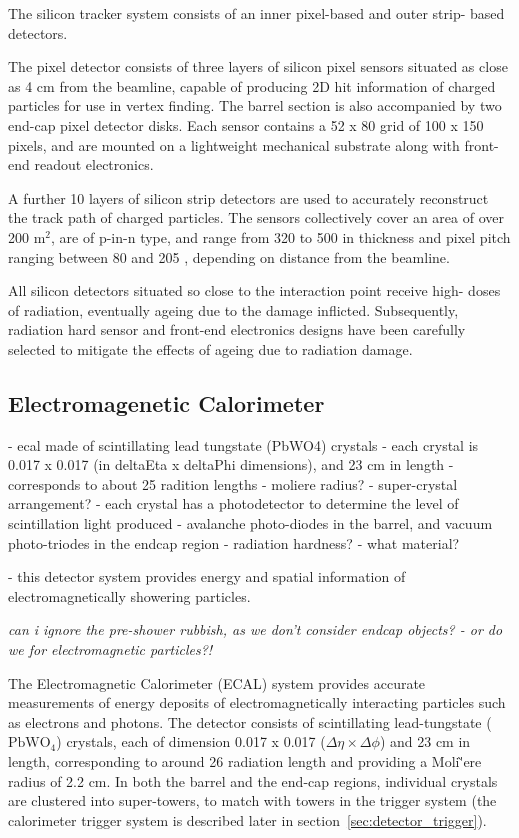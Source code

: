 The silicon tracker system consists of an inner pixel-based and outer strip-
based detectors.

The pixel detector consists of three layers of silicon pixel sensors situated 
as close as 4 cm from the beamline, capable 
of producing 2D hit information of charged particles for use in vertex 
finding. The barrel section is also accompanied by two end-cap pixel detector 
disks. Each sensor contains a 52 x 80 grid of 100 \microm x 150 \microm pixels, 
and are mounted on a lightweight mechanical substrate along with front-end readout 
electronics.

A further 10 layers of silicon strip detectors are used to accurately 
reconstruct the track path of charged particles. The sensors collectively cover 
an area of over 200 $\text{m}^2$, are of p-in-n type, and range from 320 \microm
to 500 \microm in thickness and pixel pitch ranging between 80 \microm and 
205 \microm, depending on distance from the beamline.

All silicon detectors situated so close to the interaction point receive high-
doses of radiation, eventually ageing due to the damage inflicted. Subsequently, 
radiation hard sensor and front-end electronics designs have been carefully 
selected to mitigate the effects of ageing due to radiation damage.

\subsection{Electromagenetic Calorimeter}

- ecal made of scintillating lead tungstate (PbWO4) crystals
    - each crystal is 0.017 x 0.017 (in deltaEta x deltaPhi dimensions), and 23 
    cm in length
        -   corresponds to about 25 radition lengths
        - moliere radius?
    - super-crystal arrangement?
- each crystal has a photodetector to determine the level of scintillation light
produced
    - avalanche photo-diodes in the barrel, and vacuum photo-triodes in the 
    endcap region
    - radiation hardness?
    - what material?

- this detector system provides energy and spatial information of
electromagnetically showering particles.

\emph{can i ignore the pre-shower rubbish, as we don't consider endcap objects? 
- or do we for electromagnetic particles?!}

The Electromagnetic Calorimeter (ECAL) system provides accurate measurements of 
energy deposits of electromagnetically interacting particles such as 
electrons and photons. The detector consists of scintillating lead-tungstate
($\text{PbWO}_4$) crystals, each of dimension 0.017 x 0.017 ($\Delta \eta \times
\Delta \phi$) and 23 cm in length, corresponding to around 26 radiation length 
and providing a Moli\`'{e}re radius of 2.2 cm. In both the barrel and the
end-cap regions, individual crystals are clustered
into super-towers, to match with towers in the trigger system
(the calorimeter trigger system is described later in
section~\ref{sec:detector_trigger}).


